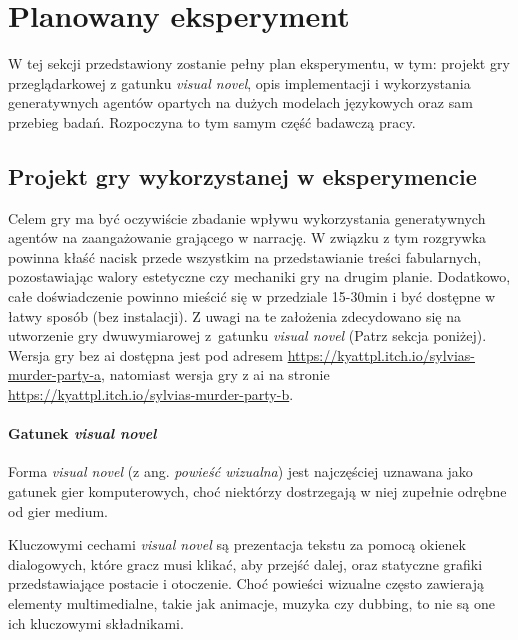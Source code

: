 \graphicspath{{chapters/chapter6/imgs/}}

\chapter{Planowany eksperyment}\label{chapter:ch6}

W tej sekcji przedstawiony zostanie pełny plan eksperymentu, w tym: projekt gry przeglądarkowej
z gatunku \textit{visual novel}, opis implementacji i wykorzystania generatywnych agentów
opartych na dużych modelach językowych oraz sam przebieg badań. Rozpoczyna to tym samym część
badawczą pracy.

\section{Projekt gry wykorzystanej w eksperymencie}\label{section:ch6_1}

Celem gry ma być oczywiście zbadanie wpływu wykorzystania generatywnych agentów na zaangażowanie
grającego w narrację. W związku z tym rozgrywka powinna kłaść nacisk przede wszystkim na
przedstawianie treści fabularnych, pozostawiając walory estetyczne czy mechaniki gry na drugim
planie. Dodatkowo, całe doświadczenie powinno mieścić się w przedziale 15-30min i być dostępne
w łatwy sposób (bez instalacji). Z uwagi na te założenia zdecydowano się na utworzenie gry
dwuwymiarowej z~gatunku \textit{visual novel} (Patrz sekcja poniżej). Wersja gry bez \gls{ai}
dostępna jest pod adresem \href{https://kyattpl.itch.io/sylvias-murder-party-a}{https://kyattpl.itch.io/sylvias-murder-party-a},
natomiast wersja gry z \gls{ai} na stronie \href{https://kyattpl.itch.io/sylvias-murder-party-b}{https://kyattpl.itch.io/sylvias-murder-party-b}.

\subsubsection*{Gatunek \textit{visual novel}}\label{subsubsection:ch6_1_1}

Forma \textit{visual novel} (z ang. \textit{powieść wizualna}) jest najczęściej uznawana jako
gatunek gier komputerowych, choć niektórzy dostrzegają w niej zupełnie odrębne od gier
medium\cite{tvtropes_visual_novel}.

Kluczowymi cechami \textit{visual novel} są prezentacja tekstu za pomocą okienek dialogowych, które gracz
musi klikać, aby przejść dalej, oraz statyczne grafiki przedstawiające postacie i otoczenie. Choć
powieści wizualne często zawierają elementy multimedialne, takie jak animacje, muzyka czy dubbing,
to nie są one ich kluczowymi składnikami\cite{tvtropes_visual_novel}.


